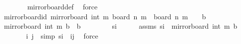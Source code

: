 \begin{isabellebody}
\ \ \ \ \ \ \isamarkupfalse%
\ mirror{}{\isacharunderscore}{\kern0pt}board{\isacharunderscore}{\kern0pt}def\ \isamarkupfalse%
\ force\isanewline
\ \ \isamarkupfalse%
\isanewline
{}\isamarkupfalse%
%
\endisatagproof
{\isafoldproof}%
%
\isadelimproof
\isanewline
%
\endisadelimproof
\isanewline
{}\isamarkupfalse%
\ mirror{}{\isacharunderscore}{\kern0pt}board{\isacharunderscore}{\kern0pt}id{\isacharcolon}{\kern0pt}\ {\isachardoublequoteopen}mirror{}{\isacharunderscore}{\kern0pt}board\ {\isacharparenleft}{\kern0pt}int\ m{\isacharplus}{\kern0pt}{}{\isacharparenright}{\kern0pt}\ {\isacharparenleft}{\kern0pt}board\ n\ m{\isacharparenright}{\kern0pt}\ {\isacharequal}{\kern0pt}\ board\ n\ m{\isachardoublequoteclose}\ {\isacharparenleft}{\kern0pt}\ {\isachardoublequoteopen}{\isacharunderscore}{\kern0pt}\ {\isacharequal}{\kern0pt}\ {\isacharquery}{\kern0pt}b{\isachardoublequoteclose}{\isacharparenright}{\kern0pt}\isanewline
%
\isadelimproof
%
\endisadelimproof
%
\isatagproof
{}\isamarkupfalse%
\isanewline
\ \ \isamarkupfalse%
\ {\isachardoublequoteopen}mirror{}{\isacharunderscore}{\kern0pt}board\ {\isacharparenleft}{\kern0pt}int\ m{\isacharplus}{\kern0pt}{}{\isacharparenright}{\kern0pt}\ {\isacharquery}{\kern0pt}b\ {\isasymsubseteq}\ {\isacharquery}{\kern0pt}b{\isachardoublequoteclose}\isanewline
\ \ \isamarkupfalse%
\isanewline
\ \ \ \ \isamarkupfalse%
\ s\isactrlsub i{\isacharprime}{\kern0pt}\isanewline
\ \ \ \ \isamarkupfalse%
\ assms{\isacharcolon}{\kern0pt}\ {\isachardoublequoteopen}s\isactrlsub i{\isacharprime}{\kern0pt}\ {\isasymin}\ mirror{}{\isacharunderscore}{\kern0pt}board\ {\isacharparenleft}{\kern0pt}int\ m{\isacharplus}{\kern0pt}{}{\isacharparenright}{\kern0pt}\ {\isacharquery}{\kern0pt}b{\isachardoublequoteclose}\isanewline
\ \ \ \ \isamarkupfalse%
\ \isamarkupfalse%
\ i{\isacharprime}{\kern0pt}\ j{\isacharprime}{\kern0pt}\ \ {\isacharbrackleft}{\kern0pt}simp{\isacharbrackright}{\kern0pt}{\isacharcolon}{\kern0pt}\ {\isachardoublequoteopen}s\isactrlsub i{\isacharprime}{\kern0pt}\ {\isacharequal}{\kern0pt}\ {\isacharparenleft}{\kern0pt}i{\isacharprime}{\kern0pt}{\isacharcomma}{\kern0pt}j{\isacharprime}{\kern0pt}{\isacharparenright}{\kern0pt}{\isachardoublequoteclose}\ \isamarkupfalse%
\ force\isanewline
\ \ \ \ \isamarkupfalse%

\end{isabellebody}

